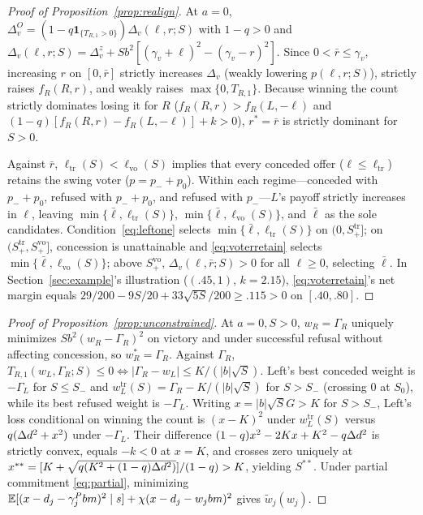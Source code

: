 \begin{proof}[Proof of Proposition~\ref{prop:realign}]
At $a=0$, $\Delta_v^O=(1-q\mathbf 1_{\{T_{R,1}>0\}})\Delta_v(\ell,r;S)$ with $1-q>0$ and $\Delta_v(\ell,r;S)=\Delta_v^z+Sb^2[(\gamma_v+\ell)^2-(\gamma_v-r)^2]$. Since $0<\bar r\le\gamma_v$, increasing $r$ on $[0,\bar r]$ strictly increases $\Delta_v$ (weakly lowering $p(\ell,r;S)$), strictly raises $f_R(R,r)$, and weakly raises $\max\{0,T_{R,1}\}$. Because winning the count strictly dominates losing it for $R$ ($f_R(R,r)>f_R(L,-\ell)$ and $(1-q)[f_R(R,r)-f_R(L,-\ell)]+k>0$), $r^*=\bar r$ is strictly dominant for $S>0$.

Against $\bar r$, $\ell_{\mathrm{tr}}(S)<\ell_{\mathrm{vo}}(S)$ implies that every conceded offer ($\ell\le\ell_{\mathrm{tr}}$) retains the swing voter ($p=p_-+p_0$). Within each regime---conceded with $p_-+p_0$, refused with $p_-+p_0$, and refused with $p_-$---$L$'s payoff strictly increases in $\ell$, leaving $\min\{\bar\ell,\ell_{\mathrm{tr}}(S)\}$, $\min\{\bar\ell,\ell_{\mathrm{vo}}(S)\}$, and $\bar\ell$ as the sole candidates. Condition~\eqref{eq:leftone} selects $\min\{\bar\ell,\ell_{\mathrm{tr}}(S)\}$ on $(0,S_+^{\mathrm{tr}}]$; on $(S_+^{\mathrm{tr}},S_+^{\mathrm{vo}}]$, concession is unattainable and \eqref{eq:voterretain} selects $\min\{\bar\ell,\ell_{\mathrm{vo}}(S)\}$; above $S_+^{\mathrm{vo}}$, $\Delta_v(\ell,\bar r;S)>0$ for all $\ell\ge 0$, selecting $\bar\ell$. In Section~\ref{sec:example}'s illustration ($(.45,1)$, $k=2.15$), \eqref{eq:voterretain}'s net margin equals $29/200-9S/20+33\sqrt{5S}/200\ge .115>0$ on $[.40,.80]$.
\end{proof}

\begin{proof}[Proof of Proposition~\ref{prop:unconstrained}]
At $a=0,S>0$, $w_R=\Gamma_R$ uniquely minimizes $Sb^2(w_R-\Gamma_R)^2$ on victory and under successful refusal without affecting concession, so $w_R^*=\Gamma_R$. Against $\Gamma_R$, $T_{R,1}(w_L,\Gamma_R;S)\le 0\iff |\Gamma_R-w_L|\le K/(|b|\sqrt{S})$. Left's best conceded weight is $-\Gamma_L$ for $S\le S_-$ and $w_L^{\mathrm{tr}}(S)=\Gamma_R-K/(|b|\sqrt{S})$ for $S>S_-$ (crossing $0$ at $S_0$), while its best refused weight is $-\Gamma_L$. Writing $x=|b|\sqrt{S}G>K$ for $S>S_-$, Left's loss conditional on winning the count is $(x-K)^2$ under $w_L^{\mathrm{tr}}(S)$ versus $q(\Delta d^2+x^2)$ under $-\Gamma_L$. Their difference $(1-q)x^2-2Kx+K^2-q\Delta d^2$ is strictly convex, equals $-k<0$ at $x=K$, and crosses zero uniquely at $x^{**}=[K+\sqrt{q(K^2+(1-q)\Delta d^2)}]/(1-q)>K$, yielding $S^{**}$. Under partial commitment \eqref{eq:partial}, minimizing $\mathbb E[(x-d_j-\gamma_j^P b m)^2\mid s]+\chi(x-d_j-w_j b m)^2$ gives $\tilde w_j(w_j)$.
\end{proof}

